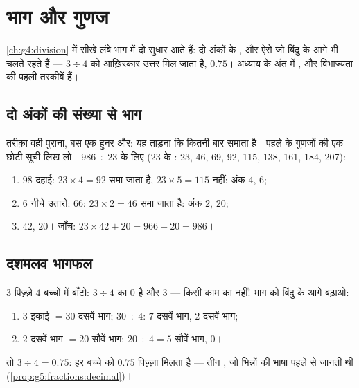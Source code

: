 \chapter{भाग और गुणज}\label{ch:g5:division}

\cref{ch:g4:division} में सीखे लंबे भाग में दो सुधार आते हैं:
दो अंकों के , और ऐसे  जो बिंदु के आगे भी चलते रहते
हैं --- $3 \div 4$ को आख़िरकार उत्तर मिल जाता है, $0.75$। अध्याय
के अंत में ,  और विभाज्यता की पहली तरकीबें हैं।

\section{दो अंकों की संख्या से भाग}

\begin{method}[दो अंकों के भाजक]\label{met:g5:division:twodigits}
तरीक़ा वही पुराना, बस एक हुनर और: यह ताड़ना कि  कितनी बार
समाता है। पहले  के गुणजों की एक छोटी सूची लिख लो।
$986 \div 23$ के लिए ($23$ के : 23, 46, 69, 92, 115,
138, 161, 184, 207):
\begin{enumerate}
  \item $98$ दहाई: $23 \times 4 = 92$ समा जाता है,
        $23 \times 5 = 115$ नहीं: अंक $4$,  $6$;
  \item $6$ नीचे उतारो: $66$: $23 \times 2 = 46$ समा जाता है:
        अंक $2$,  $20$;
  \item {} $42$,  $20$। जाँच:
        $23 \times 42 + 20 = 966 + 20 = 986$।
\end{enumerate}
\end{method}

\section{दशमलव भागफल}

\begin{example}[वह भाग जो शेषफल पर रुकने से मना कर दे]\label{ex:g5:division:decimal}
$3$ पिज़्ज़े $4$ बच्चों में बाँटो: $3 \div 4$ का  $0$ है और
 $3$ --- किसी काम का नहीं! भाग को बिंदु के आगे बढ़ाओ:
\begin{enumerate}
  \item $3$ इकाई $= 30$ दसवें भाग; $30 \div 4$: $7$ दसवें भाग,
         $2$ दसवें भाग;
  \item $2$ दसवें भाग $= 20$ सौवें भाग; $20 \div 4 = 5$ सौवें
        भाग,  $0$।
\end{enumerate}
तो $3 \div 4 = 0.75$: हर बच्चे को $0.75$ पिज़्ज़ा मिलता है ---
तीन , जो भिन्नों की भाषा पहले से जानती थी
(\cref{prop:g5:fractions:decimal})।
\end{example}

